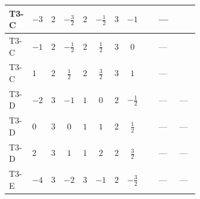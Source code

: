 \documentclass[8pt]{article}
\begin{document}
\begin{landscape}
\begin{longtable}{@{}llcccccc >{\raggedright\arraybackslash}p{0.21\linewidth} >{\raggedright\arraybackslash}p{0.21\linewidth} >{\raggedright\arraybackslash}p{0.21\linewidth}@{}}
\midrule
T3-C & $-3$ & $2$ & $-\frac{3}{2}$ & $2$ & $-\frac{1}{2}$ & $3$ & $-1$ & \scriptsize\adjustbox{max width=\linewidth}{$\begin{gathered} +4 {\lambda_{HS_2}^{(1)}} {\lambda_5}\end{gathered}$} & --- & \scriptsize\adjustbox{max width=\linewidth}{$\begin{gathered} -9 {g_2}^2 {\lambda_5}\end{gathered}$} \\
\midrule
T3-C & $-1$ & $2$ & $-\frac{1}{2}$ & $2$ & $\frac{1}{2}$ & $3$ & $0$ & \scriptsize\adjustbox{max width=\linewidth}{$\begin{gathered} +4 {\lambda_{HS_2}^{(1)}} {\lambda_5}\end{gathered}$} & --- & \scriptsize\adjustbox{max width=\linewidth}{$\begin{gathered} -9 {g_2}^2 {\lambda_5}\end{gathered}$} \\
\midrule
T3-C & $1$ & $2$ & $\frac{1}{2}$ & $2$ & $\frac{3}{2}$ & $3$ & $1$ & \scriptsize\adjustbox{max width=\linewidth}{$\begin{gathered} +4 {\lambda_{HS_2}^{(1)}} {\lambda_5}\end{gathered}$} & --- & \scriptsize\adjustbox{max width=\linewidth}{$\begin{gathered} -9 {g_2}^2 {\lambda_5}\end{gathered}$} \\
\midrule
T3-D & $-2$ & $3$ & $-1$ & $1$ & $0$ & $2$ & $-\frac{1}{2}$ & \scriptsize\adjustbox{max width=\linewidth}{$\begin{gathered} +4 {\lambda_{HS_2}^{(1)}} {\lambda_5}\end{gathered}$} & --- & --- \\
\midrule
T3-D & $0$ & $3$ & $0$ & $1$ & $1$ & $2$ & $\frac{1}{2}$ & \scriptsize\adjustbox{max width=\linewidth}{$\begin{gathered} +4 {\lambda_{HS_2}^{(1)}} {\lambda_5}\end{gathered}$} & --- & --- \\
\midrule
T3-D & $2$ & $3$ & $1$ & $1$ & $2$ & $2$ & $\frac{3}{2}$ & \scriptsize\adjustbox{max width=\linewidth}{$\begin{gathered} +4 {\lambda_{HS_2}^{(1)}} {\lambda_5}\end{gathered}$} & --- & --- \\
\midrule
T3-E & $-4$ & $3$ & $-2$ & $3$ & $-1$ & $2$ & $-\frac{3}{2}$ & \scriptsize\adjustbox{max width=\linewidth}{$\begin{gathered} +4 {\lambda_{HS_2}^{(1)}} {\lambda_5}\end{gathered}$} & --- & --- \\

\end{longtable}
\end{landscape}
\end{document}
